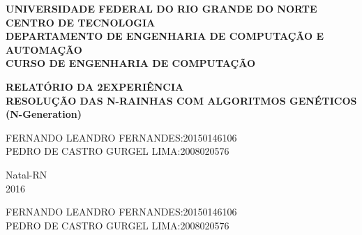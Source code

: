 \documentclass[12pt,a4paper]{article}
\begin{document}
\onehalfspacing
\thispagestyle{empty}
\setcounter{page}{1}

\begin{figure}[!ht]

\centering

\hspace{11.09cm}
\end{figure}


\begin{center}
\vspace{-0.5cm}

{\bf{\normalsize UNIVERSIDADE FEDERAL DO RIO GRANDE DO NORTE\\
CENTRO DE TECNOLOGIA\\
DEPARTAMENTO DE ENGENHARIA DE COMPUTAÇÃO E AUTOMAÇÃO\\
CURSO DE ENGENHARIA DE COMPUTAÇÃO
}}

\vspace{3.6cm}

{\bf{\large RELATÓRIO DA 2\textordfeminine\phantom{a}EXPERIÊNCIA\\
RESOLUÇÃO DAS N-RAINHAS COM ALGORITMOS GENÉTICOS (N-Generation)\\
}}

\vspace{4cm}

\begin{flushright}
\begin{normalsize}
FERNANDO LEANDRO FERNANDES:20150146106\\
\vspace{0.6cm}
PEDRO DE CASTRO GURGEL LIMA:2008020576\\

\end{normalsize}
\end{flushright}

\vspace{7cm}

{\large Natal-RN\\
2016}


\end{center}

\newpage
\thispagestyle{empty}

\begin{center}
\begin{normalsize}
FERNANDO LEANDRO FERNANDES:20150146106\\
\vspace{0.6cm}
PEDRO DE CASTRO GURGEL LIMA:2008020576\\
\end{normalsize}
\end{center}
\vspace{3cm}
\end{document}

